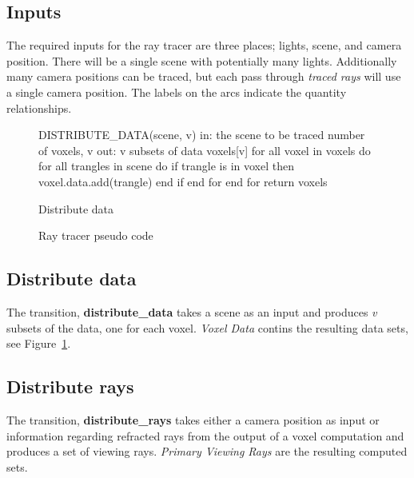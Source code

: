 \subsection{Inputs}
The required inputs for the ray tracer are three places; lights, scene, and 
camera position.  There will be a single scene with potentially many lights.  
Additionally many camera positions can be traced, but each pass through 
\emph{traced rays} will use a single camera position.  The labels on the arcs 
indicate the quantity relationships.

\begin{figure}[!htb]
\begin{algorithm}
DISTRIBUTE_DATA(scene, v)
  in:  the scene to be traced
       number of voxels, v
  out: v subsets of data
  voxels[v]
  for all voxel in voxels do
    for all trangles in scene do
      if trangle is in voxel then
        voxel.data.add(trangle)
      end if
    end for
  end for
return voxels
\end{algorithm}

Distribute data
\endminipage\hfill
\caption{Ray tracer pseudo code}
\label{fig:ray_tracing_1}
\end{figure}

\subsection{Distribute data}
The transition, \textbf{distribute\_data} takes a scene as an input and produces 
\emph{v} subsets of the data, one for each voxel.  \emph{Voxel Data} contins the
resulting data sets, see Figure~\ref{fig:ray_tracing_1}.

\subsection{Distribute rays}
The transition, \textbf{distribute\_rays} takes either a camera position as input 
or information regarding refracted rays from the output of a voxel computation 
and produces a set of viewing rays.  \emph{Primary Viewing Rays} are the 
resulting computed sets.

